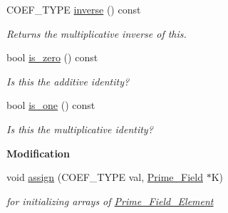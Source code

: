 \begin{Indent}
\begin{DoxyCompactItemize}
\mbox{\label{class_prime___field___element_a7e5881bb8b3f94aa8686e38e7ac78d65}} 
C\+O\+E\+F\+\_\+\+T\+Y\+PE \hyperlink{class_prime___field___element_a7e5881bb8b3f94aa8686e38e7ac78d65}{inverse} () const
\begin{DoxyCompactList}\small\item\em Returns the multiplicative inverse of {\ttfamily this}. \end{DoxyCompactList}\item 
\mbox{\label{class_prime___field___element_a50a94575283b1297a93eb41c22c599b2}} 
bool \hyperlink{class_prime___field___element_a50a94575283b1297a93eb41c22c599b2}{is\+\_\+zero} () const
\begin{DoxyCompactList}\small\item\em Is {\ttfamily this} the additive identity? \end{DoxyCompactList}\item 
\mbox{\label{class_prime___field___element_a69c26a37c2d6d3c996360d4f37cf6d98}} 
bool \hyperlink{class_prime___field___element_a69c26a37c2d6d3c996360d4f37cf6d98}{is\+\_\+one} () const
\begin{DoxyCompactList}\small\item\em Is {\ttfamily this} the multiplicative identity? \end{DoxyCompactList}\end{DoxyCompactItemize}
\end{Indent}
\begin{Indent}\textbf{ Modification}\par
\begin{DoxyCompactItemize}
\item 
\mbox{\label{class_prime___field___element_a4abca8a2002d098db965b77b17178f46}} 
void \hyperlink{class_prime___field___element_a4abca8a2002d098db965b77b17178f46}{assign} (C\+O\+E\+F\+\_\+\+T\+Y\+PE val, \hyperlink{class_prime___field}{Prime\+\_\+\+Field} $\ast$K)
\begin{DoxyCompactList}\small\item\em for initializing arrays of \hyperlink{class_prime___field___element}{Prime\+\_\+\+Field\+\_\+\+Element} \end{DoxyCompactList}\end{DoxyCompactItemize}
\end{Indent}
